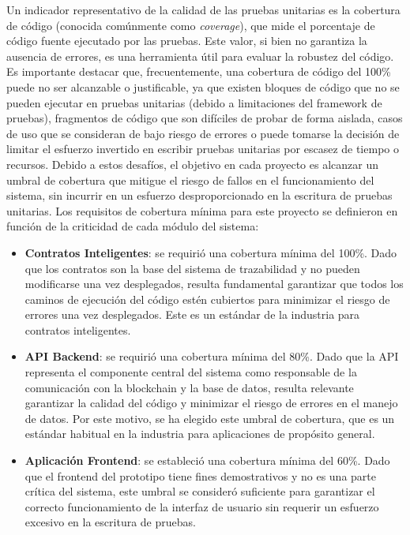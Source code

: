 

Un indicador representativo de la calidad de las pruebas unitarias es la cobertura de código (conocida comúnmente como \textit{coverage}), que mide el porcentaje de código fuente ejecutado por las pruebas. Este valor, si bien no garantiza la ausencia de errores, es una herramienta útil para evaluar la robustez del código. Es importante destacar que, frecuentemente, una cobertura de código del 100\% puede no ser alcanzable o justificable, ya que existen bloques de código que no se pueden ejecutar en pruebas unitarias (debido a limitaciones del framework de pruebas), fragmentos de código que son difíciles de probar de forma aislada, casos de uso que se consideran de bajo riesgo de errores o puede tomarse la decisión de limitar el esfuerzo invertido en escribir pruebas unitarias por escasez de tiempo o recursos. Debido a estos desafíos, el objetivo en cada proyecto es alcanzar un umbral de cobertura que mitigue el riesgo de fallos en el funcionamiento del sistema, sin incurrir en un esfuerzo desproporcionado en la escritura de pruebas unitarias. Los requisitos de cobertura mínima para este proyecto se definieron en función de la criticidad de cada módulo del sistema:

\begin{itemize}
\item \textbf{Contratos Inteligentes}: se requirió una cobertura mínima del 100\%. Dado que los contratos son la base del sistema de trazabilidad y no pueden modificarse una vez desplegados, resulta fundamental garantizar que todos los caminos de ejecución del código estén cubiertos para minimizar el riesgo de errores una vez desplegados. Este es un estándar de la industria para contratos inteligentes.
\item \textbf{API Backend}: se requirió una cobertura mínima del 80\%. Dado que la API representa el componente central del sistema como responsable de la comunicación con la blockchain y la base de datos, resulta relevante garantizar la calidad del código y minimizar el riesgo de errores en el manejo de datos. Por este motivo, se ha elegido este umbral de cobertura, que es un estándar habitual en la industria para aplicaciones de propósito general.
\item \textbf{Aplicación Frontend}: se estableció una cobertura mínima del 60\%. Dado que el frontend del prototipo tiene fines demostrativos y no es una parte crítica del sistema, este umbral se consideró suficiente para garantizar el correcto funcionamiento de la interfaz de usuario sin requerir un esfuerzo excesivo en la escritura de pruebas.
\end{itemize}

